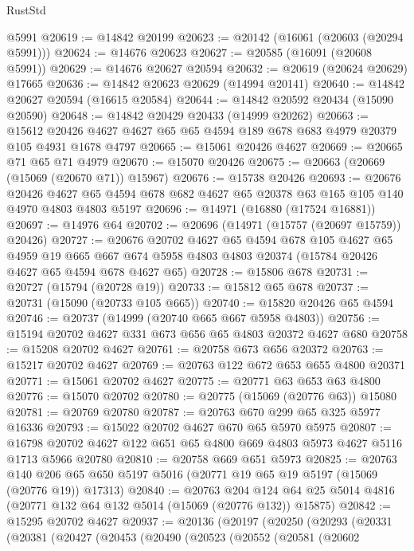 \begin{lexlean}{RustStd}
\begin{coremodule}
    @5991
@20619 := @14842 @20199
@20623 := @20142 (@16061 (@20603 (@20294 @5991)))
@20624 := @14676 @20623
@20627 := @20585 (@16091 (@20608 @5991))
@20629 := @14676 @20627 @20594
@20632 := @20619 (@20624 @20629) @17665
@20636 := @14842 @20623 @20629 (@14994 @20141)
@20640 := @14842 @20627 @20594 (@16615 @20584)
@20644 := @14842 @20592 @20434 (@15090 @20590)
@20648 := @14842 @20429 @20433 (@14999 @20262)
@20663 := @15612 @20426 @4627 @4627 @65 @65 @4594 @189 @678 @683 @4979 @20379 @105 @4931 @1678 @4797
@20665 := @15061 @20426 @4627
@20669 := @20665 @71 @65 @71 @4979
@20670 := @15070 @20426
@20675 := @20663 (@20669 (@15069 (@20670 @71)) @15967)
@20676 := @15738 @20426
@20693 := @20676
    @20426
    @4627
    @65
    @4594
    @678
    @682
    @4627
    @65
    @20378
    @63
    @165
    @105
    @140
    @4970
    @4803
    @4803
    @5197
@20696 := @14971 (@16880 (@17524 @16881))
@20697 := @14976 @64
@20702 := @20696 (@14971 (@15757 (@20697 @15759)) @20426)
@20727 := @20676
    @20702
    @4627
    @65
    @4594
    @678
    @105
    @4627
    @65
    @4959
    @19
    @665
    @667
    @674
    @5958
    @4803
    @4803
    @20374
    (@15784 @20426 @4627 @65 @4594 @678 @4627 @65)
@20728 := @15806 @678
@20731 := @20727 (@15794 (@20728 @19))
@20733 := @15812 @65 @678
@20737 := @20731 (@15090 (@20733 @105 @665))
@20740 := @15820 @20426 @65 @4594
@20746 := @20737 (@14999 (@20740 @665 @667 @5958 @4803))
@20756 := @15194 @20702 @4627 @331 @673 @656 @65 @4803 @20372 @4627 @680
@20758 := @15208 @20702 @4627
@20761 := @20758 @673 @656 @20372
@20763 := @15217 @20702 @4627
@20769 := @20763 @122 @672 @653 @655 @4800 @20371
@20771 := @15061 @20702 @4627
@20775 := @20771 @63 @653 @63 @4800
@20776 := @15070 @20702
@20780 := @20775 (@15069 (@20776 @63)) @15080
@20781 := @20769 @20780
@20787 := @20763 @670 @299 @65 @325 @5977 @16336
@20793 := @15022 @20702 @4627 @670 @65 @5970 @5975
@20807 := @16798 @20702 @4627 @122 @651 @65 @4800 @669 @4803 @5973 @4627 @5116 @1713 @5966 @20780
@20810 := @20758 @669 @651 @5973
@20825 := @20763
    @140
    @206
    @65
    @650
    @5197
    @5016
    (@20771 @19 @65 @19 @5197 (@15069 (@20776 @19)) @17313)
@20840 := @20763
    @204
    @124
    @64
    @25
    @5014
    @4816
    (@20771 @132 @64 @132 @5014 (@15069 (@20776 @132)) @15875)
@20842 := @15295 @20702 @4627
@20937 := @20136
    (@20197
      (@20250
        (@20293
          (@20331
            (@20381
              (@20427
                (@20453
                  (@20490
                    (@20523
                      (@20552
                        (@20581
                          (@20602

\end{coremodule}
\end{lexlean}
